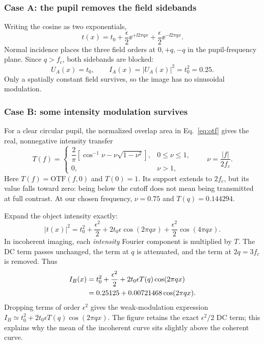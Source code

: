 \subsubsection*{Case A: the pupil removes the field sidebands}
Writing the cosine as two exponentials,
\[
t(x)=t_0+\frac{\epsilon}{2}\ee^{+\ii2\pi qx}
          +\frac{\epsilon}{2}\ee^{-\ii2\pi qx}.
\]
Normal incidence places the three field orders at $0,+q,-q$ in the
pupil-frequency plane. Since $q>f_c$, both sidebands are blocked:
\begin{equation}
U_A(x)=t_0,\qquad I_A(x)=|U_A(x)|^2=t_0^2=0.25.
\label{eq:sinusoid-coherent}
\end{equation}
Only a spatially constant field survives, so the image has no sinusoidal
modulation.

\subsubsection*{Case B: some intensity modulation survives}
For a clear circular pupil, the normalized overlap area in
Eq.~\eqref{eq:otf} gives the real, nonnegative intensity transfer
\begin{equation}
T(f)=
\begin{cases}
\dfrac{2}{\pi}\left[\cos^{-1}\nu-\nu\sqrt{1-\nu^2}\right],
&0\leq\nu\leq1,\\
0,&\nu>1,
\end{cases}
\qquad \nu=\frac{|f|}{2f_c}.
\label{eq:circular-incoherent-otf}
\end{equation}
Here $T(f)=\mathrm{OTF}(f,0)$ and $T(0)=1$.
Its support extends to $2f_c$, but its value falls toward zero:
being below the cutoff does not mean being transmitted at full contrast.
At our chosen frequency, $\nu=0.75$ and $T(q)=0.144294$.

Expand the object intensity exactly:
\[
|t(x)|^2=t_0^2+\frac{\epsilon^2}{2}
  +2t_0\epsilon\cos(2\pi qx)
  +\frac{\epsilon^2}{2}\cos(4\pi qx).
\]
In incoherent imaging, each \emph{intensity} Fourier component is
multiplied by $T$. The DC term passes unchanged, the term at $q$
is attenuated, and the term at $2q=3f_c$ is removed. Thus
\begin{align}
I_B(x)
&=t_0^2+\frac{\epsilon^2}{2}
  +2t_0\epsilon T(q)\cos(2\pi qx)\notag\\
&=0.25125+0.00721468\cos(2\pi qx).
\label{eq:sinusoid-incoherent}
\end{align}
Dropping terms of order $\epsilon^2$ gives the weak-modulation expression
$I_B\simeq t_0^2+2t_0\epsilon T(q)\cos(2\pi qx)$.
The figure retains the exact $\epsilon^2/2$ DC term; this explains why
the mean of the incoherent curve sits slightly above the coherent curve.

